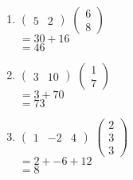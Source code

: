 \documentclass[a4paper]{article}
\begin{document}
	\begin{enumerate}[1.]
		\item $\begin{pmatrix}5 & 2\end{pmatrix}$
		$\begin{pmatrix}6 \\ 8\end{pmatrix}$\\
		$= 30 + 16$\\
		$= 46$

		\item $\begin{pmatrix}3 & 10\end{pmatrix}$
		$\begin{pmatrix}1 \\ 7\end{pmatrix}$\\
		$= 3 + 70$\\
		$= 73$

		\item $\begin{pmatrix}1 & -2 & 4\end{pmatrix}$
		$\begin{pmatrix}2 \\ 3 \\ 3\end{pmatrix}$\\
		$=2 + -6 + 12$\\
		$=8$
	\end{enumerate}
\end{document}
